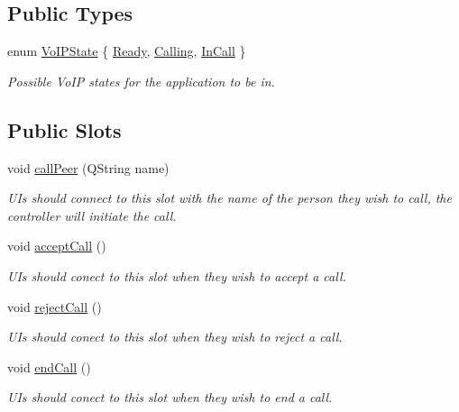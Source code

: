 \subsection*{\-Public \-Types}
\begin{DoxyCompactItemize}
\item 
enum \hyperlink{class_state_controller_a1aabd2155d8e6feb201ed3941e4ee2be}{\-Vo\-I\-P\-State} \{ \hyperlink{class_state_controller_a1aabd2155d8e6feb201ed3941e4ee2beaaa2246adace3ba467ba59ca67820f4cc}{\-Ready}, 
\hyperlink{class_state_controller_a1aabd2155d8e6feb201ed3941e4ee2beae99363dcdf7f911223e5e75d348832d4}{\-Calling}, 
\hyperlink{class_state_controller_a1aabd2155d8e6feb201ed3941e4ee2beadee615ec66e7823e546668a00c857c13}{\-In\-Call}
 \}
\begin{DoxyCompactList}\small\item\em \-Possible \-Vo\-I\-P states for the application to be in. \end{DoxyCompactList}\end{DoxyCompactItemize}
\subsection*{\-Public \-Slots}
\begin{DoxyCompactItemize}
\item 
void \hyperlink{class_state_controller_ac2d1ccb2bab7565fee787a87580cdb83}{call\-Peer} (\-Q\-String name)
\begin{DoxyCompactList}\small\item\em \-U\-Is should connect to this slot with the name of the person they wish to call, the controller will initiate the call. \end{DoxyCompactList}\item 
void \hyperlink{class_state_controller_a7ae34b3ab2c5189c2e216ef78fae6a7e}{accept\-Call} ()
\begin{DoxyCompactList}\small\item\em \-U\-Is should conect to this slot when they wish to accept a call. \end{DoxyCompactList}\item 
void \hyperlink{class_state_controller_a0898c62cc514101cda35ee08618368b8}{reject\-Call} ()
\begin{DoxyCompactList}\small\item\em \-U\-Is should conect to this slot when they wish to reject a call. \end{DoxyCompactList}\item 
void \hyperlink{class_state_controller_aa82e7568aed9fc5d1e13f7ed94535abf}{end\-Call} ()
\begin{DoxyCompactList}\small\item\em \-U\-Is should conect to this slot when they wish to end a call. \end{DoxyCompactList}\end{DoxyCompactItemize}
